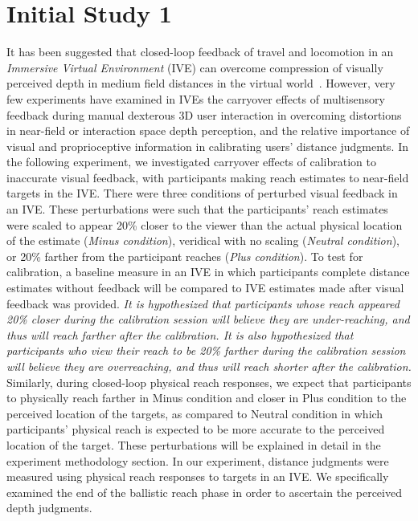 
\chapter{Initial Study 1}


It has been suggested that closed-loop feedback of travel and locomotion in an \textit{Immersive Virtual Environment} (IVE) can overcome compression of visually perceived depth in medium field distances in the virtual world~\cite{KCT13,MCT06}. However, very few experiments have examined in IVEs the carryover effects of multisensory feedback during manual dexterous 3D user interaction in overcoming distortions in near-field or interaction space depth perception, and the relative importance of visual and proprioceptive information in calibrating users’ distance judgments. In the following experiment, we investigated carryover effects of calibration to inaccurate visual feedback, with participants making reach estimates to near-field targets in the IVE. There were three conditions of perturbed visual feedback in an IVE. These perturbations were such that the participants' reach estimates were scaled to appear 20\% closer to the viewer than the actual physical location of the estimate (\textit{Minus condition}), veridical with no scaling (\textit{Neutral condition}), or 20\% farther from the participant reaches (\textit{Plus condition}). To test for calibration, a baseline measure in an IVE in which participants complete distance estimates without feedback will be compared to IVE estimates made after visual feedback was provided. \textit{It is hypothesized that participants whose reach appeared 20\% closer during the calibration session will believe they are under-reaching, and thus will reach farther after the calibration. It is also hypothesized that participants who view their reach to be 20\% farther during the calibration session will believe they are overreaching, and thus will reach shorter after the calibration.} Similarly, during closed-loop physical reach responses, we expect that participants to physically reach farther in Minus condition and closer in Plus condition to the perceived location of the targets, as compared to Neutral condition in which participants' physical reach is expected to be more accurate to the perceived location of the target. These perturbations will be explained in detail in the experiment methodology section. In our experiment, distance judgments were measured using physical reach responses to targets in an IVE. We specifically examined the end of the ballistic reach phase in order to ascertain the perceived depth judgments.


